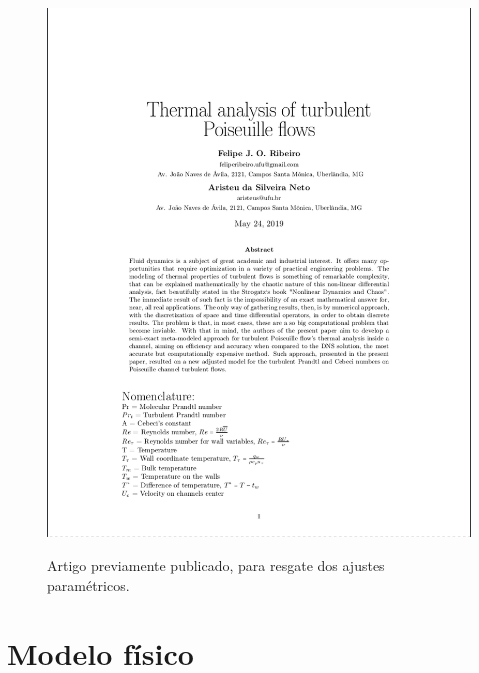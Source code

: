 \documentclass[xcolor=dvipsnames,10pt,aspectratio=169]{beamer}
\begin{document}
\begin{frame}
\begin{minipage}[h!]{0.325\textwidth}
\begin{figure}
				\includegraphics[page = 1,trim={1.0cm 1.0cm 1.0cm 0.0cm},clip=true, scale = 0.165]{Referencias/Projeto_cebeci}\\
				\caption{Artigo previamente publicado, para resgate dos ajustes paramétricos.}
			\end{figure}
			\vspace{6cm}
		\end{minipage}
	
	\end{frame}
	
	
	
	

\section{Modelo físico}
\end{document}
